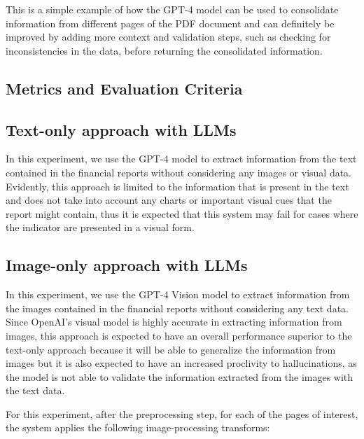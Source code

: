 \documentclass[english, 12pt, a4paper, elec, utf8, a-2b, online]{aaltothesis}
\begin{document}
This is a simple example of how the \ac{GPT}-4 model can be used to consolidate information from different pages of the \ac{PDF} document and can definitely be improved by adding more context and validation steps, such as checking for inconsistencies in the data, before returning the consolidated information.

\subsection{Metrics and Evaluation Criteria}

\subsection{Text-only approach with \ac{LLM}s}

In this experiment, we use the \ac{GPT}-4 model to extract information from the text contained in the financial reports without considering any images or visual data.
Evidently, this approach is limited to the information that is present in the text and does not take into account any charts or important visual cues that the report might contain, thus it is expected that this system may fail for cases where the indicator are presented in a visual form.

\subsection{Image-only approach with \ac{LLM}s}

In this experiment, we use the \ac{GPT}-4 Vision model to extract information from the images contained in the financial reports without considering any text data.
Since OpenAI's visual model is highly accurate in extracting information from images, this approach is expected to have an overall performance superior to the text-only approach because it will be able to generalize the information from images but it is also expected to have an increased proclivity to hallucinations, as the model is not able to validate the information extracted from the images with the text data.

For this experiment, after the preprocessing step, for each of the pages of interest, the system applies the following image-processing transforms:
\end{document}
